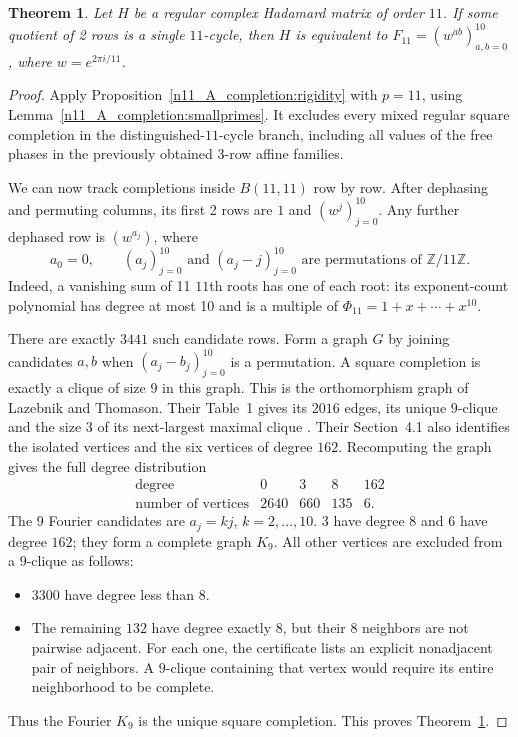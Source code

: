 \documentclass[11pt,a4paper]{article}
\newtheorem{theorem}{Theorem}[section]
\numberwithin{equation}{section}
\begin{document}
\begin{theorem}\label{n11_A_completion:main}
Let $H$ be a regular complex Hadamard matrix of order $11$. If some quotient of 2 rows is a single $11$-cycle, then $H$ is equivalent to $F_{11}=(w^{ab})_{a,b=0}^{10}$, where $w=e^{2\pi i/11}$.
\end{theorem}
\begin{proof}
Apply Proposition~\ref{n11_A_completion:rigidity} with $p=11$, using Lemma~\ref{n11_A_completion:smallprimes}. It excludes every mixed regular square completion in the distinguished-$11$-cycle branch, including all values of the free phases in the previously obtained 3-row affine families.

\medskip\label{sec:A_fourier}
We can now track completions inside $B(11,11)$ row by row. After dephasing and permuting columns, its first 2 rows are $1$ and $(w^{j})_{j=0}^{10}$. Any further dephased row is $(w^{a_j})$, where
$$a_0=0,\qquad (a_j)_{j=0}^{10}\text{ and }(a_j-j)_{j=0}^{10} \text{ are permutations of }\mathbb{Z}/11\mathbb{Z}.$$
Indeed, a vanishing sum of 11 $11$th roots has one of each root: its exponent-count polynomial has degree at most 10 and is a multiple of $\Phi_{11}=1+x+\cdots+x^{10}$.

There are exactly $3441$ such candidate rows. Form a graph $G$ by joining candidates $a,b$ when $(a_j-b_j)_{j=0}^{10}$ is a permutation. A square completion is exactly a clique of size 9 in this graph. This is the orthomorphism graph of Lazebnik and Thomason. Their Table~1 gives its $2016$ edges, its unique $9$-clique and the size $3$ of its next-largest maximal clique \cite{lt}. Their Section~4.1 also identifies the isolated vertices and the six vertices of degree $162$. Recomputing the graph gives the full degree distribution
$$\begin{array}{c|rrrr}
\text{degree}&0&3&8&162\\\hline
\text{number of vertices}&2640&660&135&6.
\end{array}$$
The 9 Fourier candidates are $a_j=kj$, $k=2,\ldots,10$. 3 have degree 8 and 6 have degree $162$; they form a complete graph $K_9$. All other vertices are excluded from a $9$-clique as follows:
\begin{itemize}[label=$\bullet$]
\item $3300$ have degree less than 8.
\item The remaining $132$ have degree exactly 8, but their 8 neighbors are not pairwise adjacent. For each one, the certificate lists an explicit nonadjacent pair of neighbors. A $9$-clique containing that vertex would require its entire neighborhood to be complete.
\end{itemize}
Thus the Fourier $K_9$ is the unique square completion. This proves Theorem~\ref{n11_A_completion:main}.
\end{proof}
\end{document}
